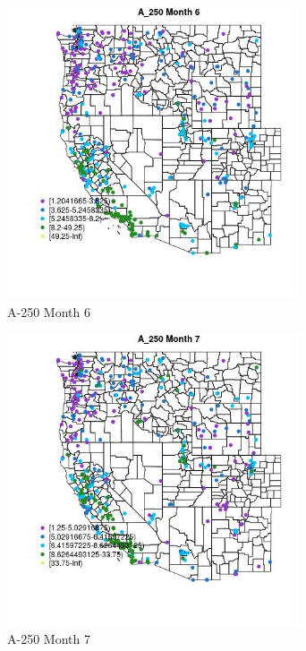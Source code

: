 \begin{figure} 
\centering  
\includegraphics[width=0.77\textwidth]{Code_Outputs/ML_input_report_ML_input_PM25_Step5_part_d_de_duplicated_aves_ML_input_MapObsMo6A_250.jpg} 
\caption{\label{fig:ML_input_report_ML_input_PM25_Step5_part_d_de_duplicated_aves_ML_inputMapObsMo6A_250}A-250 Month 6} 
\end{figure} 
 

\begin{figure} 
\centering  
\includegraphics[width=0.77\textwidth]{Code_Outputs/ML_input_report_ML_input_PM25_Step5_part_d_de_duplicated_aves_ML_input_MapObsMo7A_250.jpg} 
\caption{\label{fig:ML_input_report_ML_input_PM25_Step5_part_d_de_duplicated_aves_ML_inputMapObsMo7A_250}A-250 Month 7} 
\end{figure} 
 


